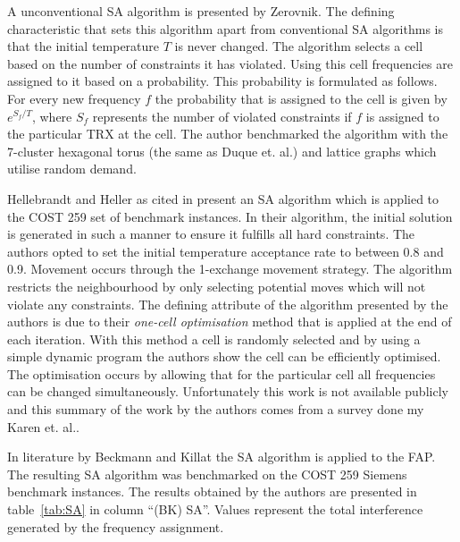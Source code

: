 A unconventional \gls{SA} algorithm  is presented by Zerovnik\cite{Zerovnik97}. The defining characteristic that sets this algorithm apart from conventional \gls{SA} algorithms is that the initial temperature $T$ is never changed. The algorithm selects a cell based on the number of constraints it has violated. Using this cell frequencies are assigned to it based on a probability. This probability is formulated as follows. For every new frequency $f$ the probability that is assigned to the cell is given by $e^{S_f/T}$, where $S_f$ represents the number of violated constraints if $f$ is assigned to the particular TRX at the cell\cite{Zerovnik97}. The author benchmarked the algorithm with the 7-cluster hexagonal torus (the same as Duque et. al.\cite{SAChanAss}) and lattice graphs which utilise random demand.

Hellebrandt and Heller \cite{Hehe00} as cited in \cite{Karen2004} present an \gls{SA} algorithm which is applied to the COST 259 set of benchmark instances. In their algorithm, the initial solution is generated in such a manner to ensure it fulfills all hard constraints. The authors opted to set the initial temperature acceptance rate to between 0.8 and 0.9. Movement occurs through the 1-exchange movement strategy. The algorithm restricts the neighbourhood by only selecting potential moves which will not violate any constraints. The defining attribute of the algorithm presented by the authors is due to their \emph{one-cell optimisation} method that is applied at the end of each iteration. With this method a cell is randomly selected and by using a simple dynamic program the authors show the cell can be efficiently optimised. The optimisation occurs by allowing that for the particular cell all frequencies can be changed simultaneously\cite{Hehe00}. Unfortunately this work is not available publicly and this summary of the work by the authors comes from a survey done my Karen et. al.\cite{Karen2004}.

In literature by Beckmann and Killat\cite{BeKi99a} the \gls{SA} algorithm is applied to the \gls{FAP}. The resulting \gls{SA} algorithm was benchmarked on the \gls{COST} 259 Siemens benchmark instances. The results obtained by the authors are presented in table~\ref{tab:SA} in column ``(BK) \gls{SA}''. Values represent the total interference generated by the frequency assignment. 

